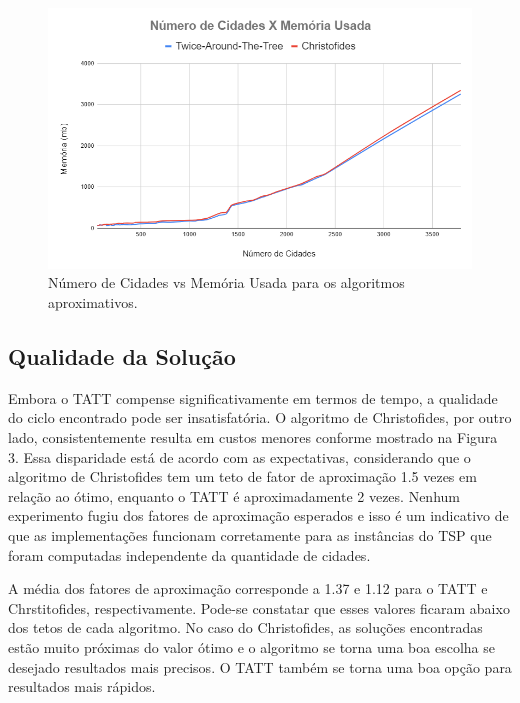 \documentclass[12pt]{article}
\begin{document}
\begin{figure}[ht]
\centering
\includegraphics[width=\textwidth]{Memory.png}
\caption{Número de Cidades vs Memória Usada para os algoritmos aproximativos.}
\label{fig:memory}
\end{figure}

\subsection{Qualidade da Solução}

Embora o TATT compense significativamente em termos de tempo, a qualidade do ciclo encontrado pode ser insatisfatória. O algoritmo de Christofides, por outro lado, consistentemente resulta em custos menores conforme mostrado na Figura 3. Essa disparidade está de acordo com as expectativas, considerando que o algoritmo de Christofides tem um teto de fator de aproximação 1.5 vezes em relação ao ótimo, enquanto o TATT é aproximadamente 2 vezes. Nenhum experimento fugiu dos fatores de aproximação esperados e isso é um indicativo de que as implementações funcionam corretamente para as instâncias do TSP que foram computadas independente da quantidade de cidades.

A média dos fatores de aproximação corresponde a 1.37 e 1.12 para o TATT e Chrstitofides, respectivamente. Pode-se constatar que esses valores ficaram abaixo dos tetos de cada algoritmo. No caso do Christofides, as soluções encontradas estão muito próximas do valor ótimo e o algoritmo se torna uma boa escolha se desejado resultados mais precisos. O TATT também se torna uma boa opção para resultados mais rápidos.  
\end{document}

